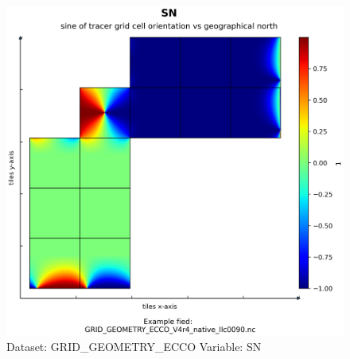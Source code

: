 \begin{figure}[H]
\centering
\includegraphics[width=\textwidth]{../images/plots/native_plots_coords/Geometry_Parameters_for_the_Lat-Lon-Cap_90_(llc90)_Native_Model_Grid_(Version_4_Release_4)/SN.png}
\caption{Dataset: GRID\_GEOMETRY\_ECCO Variable: SN}
\label{tab:table-GRID_GEOMETRY_ECCO_SN-Plot}
\end{figure}
\pagebreak
